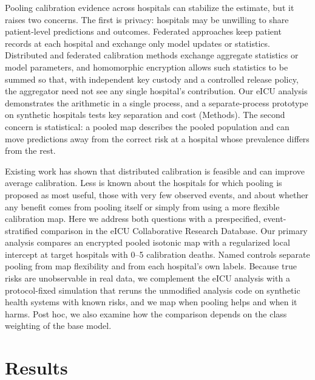 \documentclass[11pt]{article}
\begin{document}
Pooling calibration evidence across hospitals can stabilize the estimate, but it raises two concerns. The first is privacy: hospitals may be unwilling to share patient-level predictions and outcomes. Federated approaches keep patient records at each hospital and exchange only model updates or statistics\cite{rieke2020}. Distributed and federated calibration methods exchange aggregate statistics or model parameters\cite{r4,r5,r16,r6,r20}, and homomorphic encryption allows such statistics to be summed so that, with independent key custody and a controlled release policy, the aggregator need not see any single hospital's contribution\cite{r18,r7,r8}. Our eICU analysis demonstrates the arithmetic in a single process, and a separate-process prototype on synthetic hospitals tests key separation and cost (Methods). The second concern is statistical: a pooled map describes the pooled population and can move predictions away from the correct risk at a hospital whose prevalence differs from the rest.

Existing work has shown that distributed calibration is feasible and can improve average calibration\cite{r4,r5,r6}. Less is known about the hospitals for which pooling is proposed as most useful, those with very few observed events, and about whether any benefit comes from pooling itself or simply from using a more flexible calibration map. Here we address both questions with a prespecified, event-stratified comparison in the eICU Collaborative Research Database\cite{r1,r2}. Our primary analysis compares an encrypted pooled isotonic map with a regularized local intercept at target hospitals with 0--5 calibration deaths. Named controls separate pooling from map flexibility and from each hospital's own labels. Because true risks are unobservable in real data, we complement the eICU analysis with a protocol-fixed simulation that reruns the unmodified analysis code on synthetic health systems with known risks, and we map when pooling helps and when it harms. Post hoc, we also examine how the comparison depends on the class weighting of the base model.

\section*{Results}
\end{document}
